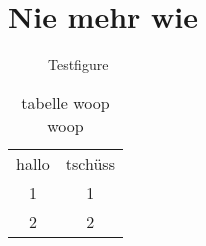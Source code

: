 \chapter{Nie mehr wie}

\lipsum[10]
\begin{figure}
	\caption{Testfigure}
	\label{fig:test}
\end{figure}

\begin{table}
	\caption{tabelle woop woop}
	\label{tb:one}
	\begin{tabular}{cc}
		hallo & tschüss \\
		1 & 1 \\
		2 & 2 \\
	\end{tabular}
\end{table}
\lipsum[50-65]